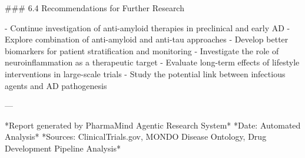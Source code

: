 ### 6.4 Recommendations for Further Research

- Continue investigation of anti-amyloid therapies in preclinical and early AD
- Explore combination of anti-amyloid and anti-tau approaches
- Develop better biomarkers for patient stratification and monitoring
- Investigate the role of neuroinflammation as a therapeutic target
- Evaluate long-term effects of lifestyle interventions in large-scale trials
- Study the potential link between infectious agents and AD pathogenesis

---

*Report generated by PharmaMind Agentic Research System*  
*Date: Automated Analysis*  
*Sources: ClinicalTrials.gov, MONDO Disease Ontology, Drug Development Pipeline Analysis*
